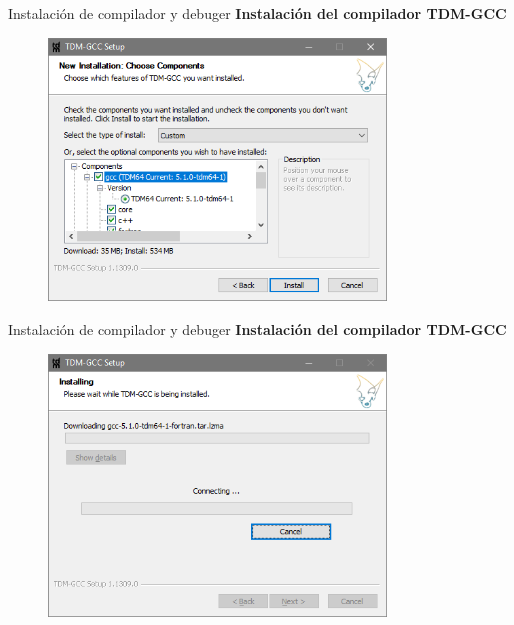\begin{frame}[fragile]{Instalación de compilador y debuger}
 \textbf{Instalación del compilador TDM-GCC}
  \begin{figure}
      \includegraphics[width=0.8\textwidth]{./resources/TDMGCC_Step_06.PNG}
  \end{figure}
\end{frame}

\begin{frame}[fragile]{Instalación de compilador y debuger}
 \textbf{Instalación del compilador TDM-GCC}
  \begin{figure}
      \includegraphics[width=0.8\textwidth]{./resources/TDMGCC_Step_07.PNG}
  \end{figure}
\end{frame}

